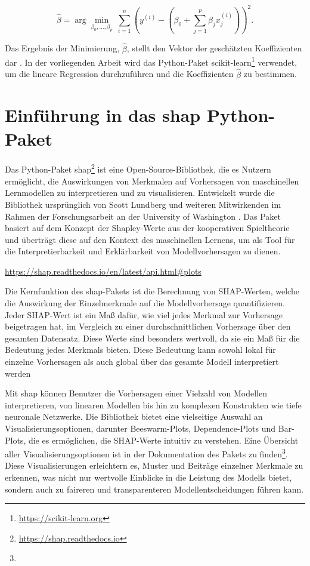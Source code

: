\begin{equation}
    \hat{\beta} = \arg \underset{\beta_0, \ldots, \beta_p}{\min} \ \sum_{i=1}^{n} \left( y^{(i)} - \left( \beta_0 + \sum_{j=1}^{p} \beta_j x_j^{(i)}\right)\right)^2.
\end{equation}

Das Ergebnis der Minimierung, \( \hat{\beta} \), stellt den Vektor der geschätzten Koeffizienten dar \cite[S. 37]{Molnar_2022}. 
In der vorliegenden Arbeit wird das Python-Paket \textsf{scikit-learn}\footnote{\url{https://scikit-learn.org}} verwendet, um die lineare Regression durchzuführen und die Koeffizienten 
\( \hat{\beta} \) zu bestimmen. 


\section{Einführung in das \textsf{shap} Python-Paket}
\label{sec:shap-package}

Das Python-Paket \textsf{shap}\footnote{\url{https://shap.readthedocs.io}} ist eine Open-Source-Bibliothek, die es Nutzern ermöglicht, 
die Auswirkungen von Merkmalen auf Vorhersagen von maschinellen Lernmodellen zu interpretieren und zu visualisieren. 
Entwickelt wurde die Bibliothek ursprünglich von Scott Lundberg und weiteren Mitwirkenden im Rahmen der Forschungsarbeit 
an der University of Washington \cite{NIPS2017_8a20a862}. Das Paket basiert auf dem Konzept der Shapley-Werte aus der kooperativen Spieltheorie 
und überträgt diese auf den Kontext des maschinellen Lernens, um als Tool für die Interpretierbarkeit und Erklärbarkeit 
von Modellvorhersagen zu dienen.

\urldef{\ploturl}\url{https://shap.readthedocs.io/en/latest/api.html#plots}

Die Kernfunktion des \textsf{shap}-Pakets ist die Berechnung von SHAP-Werten, welche die Auswirkung der 
Einzelmerkmale auf die Modellvorhersage quantifizieren. Jeder SHAP-Wert ist ein Maß dafür, wie viel jedes Merkmal 
zur Vorhersage beigetragen hat, im Vergleich zu einer durchschnittlichen Vorhersage über den gesamten Datensatz. 
Diese Werte sind besonders wertvoll, da sie ein Maß für die Bedeutung jedes Merkmals bieten. Diese Bedeutung kann 
sowohl lokal für einzelne Vorhersagen als auch global über das gesamte Modell interpretiert werden

Mit \textsf{shap} können Benutzer die Vorhersagen einer Vielzahl von Modellen interpretieren, 
von linearen Modellen bis hin zu komplexen Konstrukten wie tiefe neuronale Netzwerke. 
Die Bibliothek bietet eine vielseitige Auswahl an Visualisierungsoptionen, darunter Beeswarm-Plots, Dependence-Plots und 
Bar-Plots, die es ermöglichen, die SHAP-Werte intuitiv zu verstehen. Eine Übersicht aller Visualisierungsoptionen ist in der Dokumentation 
des Pakets zu finden\footnote{\ploturl}.
Diese Visualisierungen erleichtern es, Muster und Beiträge einzelner Merkmale zu erkennen, 
was nicht nur wertvolle Einblicke in die Leistung des Modells bietet, sondern auch zu faireren und transparenteren 
Modellentscheidungen führen kann. 

